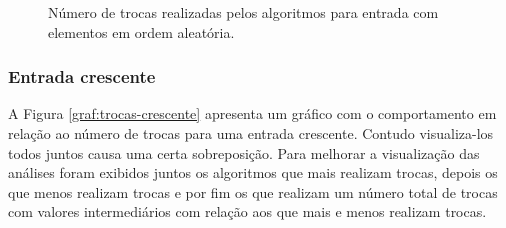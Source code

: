 \documentclass[conference,onecolumn]{IEEEtran}
\begin{document}
\begin{figure}[H]
\begin{center}
\end{center}
\caption{Número de trocas realizadas pelos algoritmos para entrada com elementos em ordem aleatória.}
\label{graf:trocas-aleatoria-menores}
\end{figure}

\subsubsection{Entrada crescente}

A Figura \ref{graf:trocas-crescente} apresenta um gráfico com o comportamento em relação ao número de trocas para uma entrada crescente. Contudo visualiza-los todos juntos causa uma certa sobreposição. Para melhorar a visualização das análises foram exibidos juntos os algoritmos que mais realizam trocas, depois os que menos realizam trocas e por fim os que realizam um número total de trocas com valores intermediários com relação aos que mais e menos realizam trocas.
\end{document}
